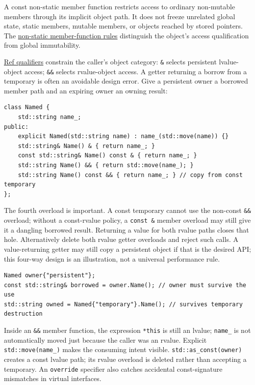 A const non-static member function restricts access to ordinary non-mutable members through its implicit object path. It does not freeze unrelated global state, static members, mutable members, or objects reached by stored pointers. The \href{https://eel.is/c++draft/class.mfct.non.static}{non-static member-function rules} distinguish the object's access qualification from global immutability.

\hyperref[appendix-d42039b1d6f7]{Ref qualifiers} constrain the caller's object category: \texttt{\&} selects persistent lvalue-object access; \texttt{\&\&} selects rvalue-object access. A getter returning a borrow from a temporary is often an avoidable design error. Give a persistent owner a borrowed member path and an expiring owner an owning result:

\begin{verbatim}
class Named {
    std::string name_;
public:
    explicit Named(std::string name) : name_(std::move(name)) {}
    std::string& Name() & { return name_; }
    const std::string& Name() const & { return name_; }
    std::string Name() && { return std::move(name_); }
    std::string Name() const && { return name_; } // copy from const temporary
};
\end{verbatim}

The fourth overload is important. A const temporary cannot use the non-const \texttt{\&\&} overload; without a const-rvalue policy, a \texttt{const\ \&} member overload may still give it a dangling borrowed result. Returning a value for both rvalue paths closes that hole. Alternatively delete both rvalue getter overloads and reject such calls. A value-returning getter may still copy a persistent object if that is the desired API; this four-way design is an illustration, not a universal performance rule.

\begin{verbatim}
Named owner{"persistent"};
const std::string& borrowed = owner.Name(); // owner must survive the use
std::string owned = Named{"temporary"}.Name(); // survives temporary destruction
\end{verbatim}

Inside an \texttt{\&\&} member function, the expression \texttt{*this} is still an lvalue; \texttt{name\_} is not automatically moved just because the caller was an rvalue. Explicit \texttt{std::move(name\_)} makes the consuming intent visible. \texttt{std::as\_const(owner)} creates a const lvalue path; its rvalue overload is deleted rather than accepting a temporary. An \texttt{override} specifier also catches accidental const-signature mismatches in virtual interfaces.

